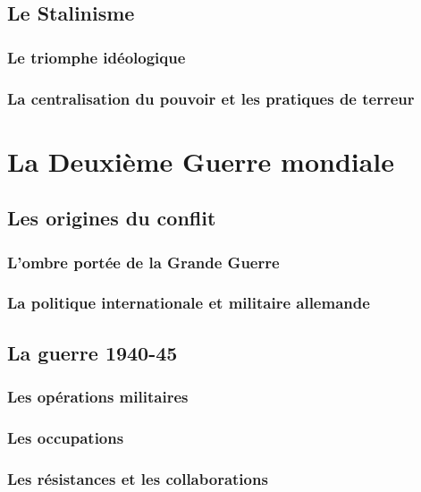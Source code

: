 \documentclass[12pt]{report}
\begin{document}
\section{Le Stalinisme}

\subsection{Le triomphe idéologique}

\subsection{La centralisation du pouvoir et les pratiques de terreur}



\chapter{La Deuxième Guerre mondiale}

\section{Les origines du conflit}

\subsection{L'ombre portée de la Grande Guerre}

\subsection{La politique internationale et militaire allemande}

\section{La guerre 1940-45}

\subsection{Les opérations militaires}

\subsection{Les occupations}

\subsection{Les résistances et les collaborations}
\end{document}
